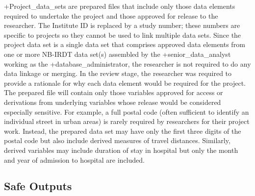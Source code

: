 \documentclass[
]{book}
\begin{document}
+Project\_data\_sets\textbar{} are prepared files that include only those data elements required to undertake the project and those approved for release to the researcher. The Institute ID is replaced by a study number; these numbers are specific to projects so they cannot be used to link multiple data sets. Since the project data set is a single data set that comprises approved data elements from one or more NB-IRDT data set(s) assembled by the +senior\_data\_analyst\textbar{} working as the +database\_administrator\textbar, the researcher is not required to do any data linkage or merging. In the review stage, the researcher was required to provide a rationale for why each data element would be required for the project. The prepared file will contain only those variables approved for access or derivations from underlying variables whose release would be considered especially sensitive. For example, a full postal code (often sufficient to identify an individual street in urban areas) is rarely required by researchers for their project work. Instead, the prepared data set may have only the first three digits of the postal code but also include derived measures of travel distances. Similarly, derived variables may include duration of stay in hospital but only the month and year of admission to hospital are included.

\hypertarget{safe-outputs-2}{%
\subsection{Safe Outputs}\label{safe-outputs-2}}
\end{document}

